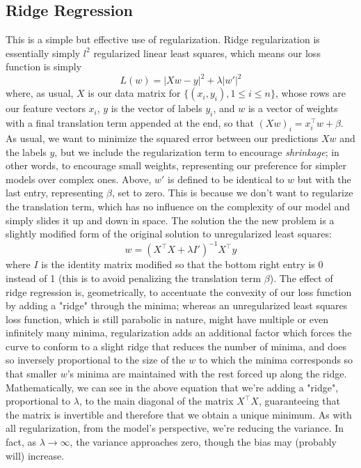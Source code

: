 \documentclass{article}
\begin{document}
\subsection{Ridge Regression}
This is a simple but effective use of regularization. Ridge regularization is essentially simply $ l^2 $ regularized linear least squares, which means our loss function is simply
$$ L(w) = | X w - y |^2 + \lambda | w' |^2 $$
where, as usual, $ X $ is our data matrix for $ \{ (x_i, y_i), 1 \leq i \leq n \} $, whose rows are our feature vectors $ x_i $, $ y $ is the vector of labels $ y_i $, and $ w $ is a vector of weights with a final translation term appended at the end, so that $ (X w)_i = x_i^\intercal w + \beta $. As usual, we want to minimize the squared error between our predictions $ X w $ and the labels $ y $, but we include the regularization term to encourage \textit{shrinkage}; in other words, to encourage small weights, representing our preference for simpler models over complex ones. Above, $ w' $ is defined to be identical to $ w $ but with the last entry, representing $ \beta $, set to zero. This is because we don't want to regularize the translation term, which has no influence on the complexity of our model and simply slides it up and down in space.
\newline \newline
The solution the the new problem is a slightly modified form of the original solution to unregularized least squares:
$$ w = (X^\intercal X + \lambda I')^{-1} X^\intercal y $$
where $ I $ is the identity matrix modified so that the bottom right entry is 0 instead of 1 (this is to avoid penalizing the translation term $ \beta $). The effect of ridge regression is, geometrically, to accentuate the convexity of our loss function by adding a "ridge" through the minima; whereas an unregularized least squares loss function, which is still parabolic in nature, might have multiple or even infinitely many minima, regularization adds an additional factor which forces the curve to conform to a slight ridge that reduces the number of minima, and does so inversely proportional to the size of the $ w $ to which the minima corresponds so that smaller $ w $'s minima are maintained with the rest forced up along the ridge. Mathematically, we can see in the above equation that we're adding a "ridge", proportional to $ \lambda $, to the main diagonal of the matrix $ X^\intercal X $, guaranteeing that the matrix is invertible and therefore that we obtain a unique minimum. As with all regularization, from the model's perspective, we're reducing the variance. In fact, as $ \lambda \rightarrow \infty $, the variance approaches zero, though the bias may (probably will) increase.
\end{document}
